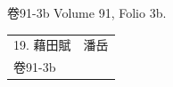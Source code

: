 卷91-3b
Volume 91, Folio 3b.


\begin{longtable}{p{} p{}}

\multicolumn{2}{l}{19. 藉田賦　潘岳}\\
\multicolumn{2}{l}{卷91-3b}\\

















\end{longtable}
